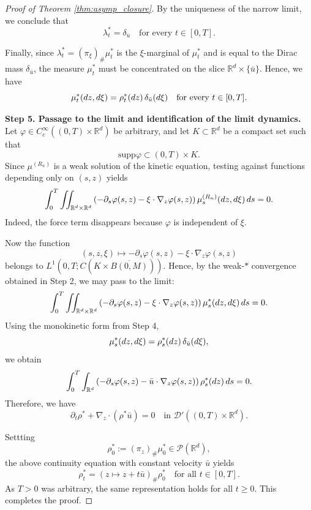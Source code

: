 \documentclass[10pt,a4paper]{amsart}
\newcommand{\R}{\mathbb R}
\newcommand{\calD}{\mathcal D}
\newcommand{\calP}{\mathcal P}
\renewcommand{\ge}{\geqslant}
\newcommand{\intr}{\int_{\R^d}}
\newcommand{\intrr}{\iint_{\R^d \times \R^d}}
\newcommand{\lt}{\left}
\newcommand{\rd}{\textnormal{d}}
\newcommand{\rt}{\right}
\newcommand{\supp}{\text{supp}}
\begin{document}
\begin{proof}[Proof of Theorem \ref{thm:asymp_closure}]
By the uniqueness of the narrow limit, we conclude that
\[
\lambda^\ast_t=\delta_{\bar u} \quad\text{for every }t\in[0,T].
\]

Finally, since $\lambda^\ast_t=(\pi_\xi)_\#\mu^\ast_t$ is the $\xi$-marginal of $\mu^\ast_t$
and is equal to the Dirac mass $\delta_{\bar u}$, the measure $\mu^\ast_t$ must be concentrated on the slice
$\R^d\times\{\bar u\}$. Hence, we have
\[
\mu^\ast_t(\rd z,\rd\xi)=\rho^\ast_t(\rd z)\,\delta_{\bar u}(\rd\xi)
\quad\text{for every }t\in[0,T].
\]

\medskip
\noindent\textbf{Step 5. Passage to the limit and identification of the limit dynamics.}
Let $\varphi\in C_c^\infty((0,T)\times\R^d)$ be arbitrary, and let
$K\subset\R^d$ be a compact set such that
\[
\supp\varphi\subset (0,T)\times K.
\]
Since $\mu^{(R_n)}$ is a weak solution of the kinetic equation, testing against
functions depending only on $(s,z)$ yields
\[
\int_0^T\intrr
\lt(-\partial_s\varphi(s,z)-\xi\cdot\nabla_z\varphi(s,z)\rt) \mu^{(R_n)}_s(\rd z,\rd\xi)\,\rd s=0.
\]
Indeed, the force term disappears because $\varphi$ is independent of $\xi$.

Now the function
\[
(s,z,\xi)\mapsto -\partial_s\varphi(s,z)-\xi\cdot\nabla_z\varphi(s,z)
\]
belongs to $L^1(0,T;C(K\times\overline{B(0,M)}))$.
Hence, by the weak-$\ast$ convergence obtained in Step 2, we may pass to the limit:
\[
\int_0^T\intrr \lt(-\partial_s\varphi(s,z)-\xi\cdot\nabla_z\varphi(s,z)\rt) \mu^\ast_s(\rd z,\rd\xi)\,\rd s=0.
\]
Using the monokinetic form from Step 4,
\[
\mu^\ast_s(\rd z,\rd\xi)=\rho^\ast_s(\rd z)\,\delta_{\bar u}(\rd\xi),
\]
we obtain
\[
\int_0^T\intr \lt(-\partial_s\varphi(s,z)-\bar u\cdot\nabla_z\varphi(s,z)\rt) \rho^\ast_s(\rd z)\,\rd s=0.
\]
Therefore, we have
\[
\partial_t\rho^\ast + \nabla_z \cdot (\rho^\ast \bar u)=0 \quad\text{in }\calD'((0,T)\times\R^d).
\]

Settting
\[
\rho^\ast_0 := (\pi_z)_\#\mu^\ast_0 \in \calP(\R^d),
\]
the above continuity equation with constant velocity $\bar u$ yields
\[
\rho^\ast_t=(z\mapsto z+t\bar u)_\#\rho^\ast_0 \quad\text{for all }t\in[0,T].
\]
As $T>0$ was arbitrary, the same representation holds for all $t\ge0$.
This completes the proof.
\end{proof}
\end{document}
